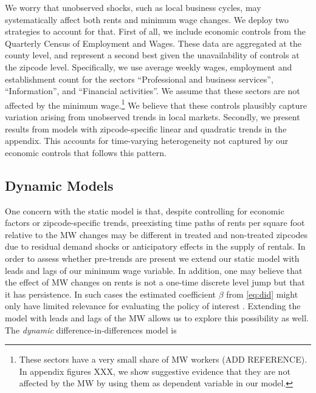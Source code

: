 
We worry that unobserved shocks, such as local business cycles, may systematically 
affect both rents and minimum wage changes. We deploy two strategies to account 
for that. First of all, we include economic controls from the Quarterly Census of 
Employment and Wages. These data are aggregated at the county level, and represent a 
second best given the unavailability of controls at the zipcode level. Specifically, we 
use average weekly wages, employment and establishment count for the sectors 
``Professional and business services'', ``Information'', and ``Financial activities''. 
We assume that these sectors are not affected by the minimum wage.\footnote{These sectors have a very small share of MW workers (ADD REFERENCE). In appendix figures XXX, we show suggestive evidence that they are not affected by the MW by using them as dependent variable in our model.}
We believe that these controls plausibly capture variation arising from unobserved trends 
in local markets. Secondly, we present results from models with zipcode-specific linear 
and quadratic trends in the appendix. This accounts for time-varying heterogeneity not 
captured by our economic controls that follows this pattern.

\subsection{Dynamic Models}

One concern with the static model is that, despite controlling for economic 
factors or zipcode-specific trends, preexisting time paths of rents per square foot relative to the MW 
changes may  be different in treated and non-treated zipcodes due to residual demand 
shocks or anticipatory effects in the supply of rentals. In order to assess whether pre-trends are 
present we extend our static model with leads and lags of our minimum wage variable. 
In addition, one may believe that the effect of MW changes on rents is not a one-time discrete level 
jump but that it has persistence. In such cases the estimated coefficient $\beta$ from 
\autoref{eq:did} might only have limited relevance for evaluating the policy of interest 
\parencite{callaway2019}. Extending the model with leads and lags of the MW allows us to 
explore this possibility as well. The \textit{dynamic} difference-in-differences model is

